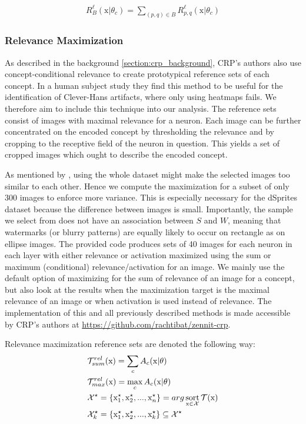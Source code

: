 \begin{align}\label{eq:local_importance}
    R_{B}^{\ell}(\mathrm{x} | \theta_c) = \sum_{(p,q) \in B} R_{p,q}^{\ell}(\mathrm{x} | \theta_c)
\end{align}

\subsubsection{Relevance Maximization}
As described in the background \cref{section:crp_background}, CRP's authors also use concept-conditional relevance to create prototypical reference sets of each concept. In a human subject study \citep{Achtibat2023} they find this method to be useful for the identification of Clever-Hans artifacts, where only using heatmaps fails. We therefore aim to include this technique into our analysis. The reference sets consist of  images with maximal relevance for a neuron. Each image can be further concentrated on the encoded concept by thresholding the relevance and by cropping to the receptive field of the neuron in question. This yields a set of cropped images which ought to describe the encoded concept. 

As mentioned by \citet{Achtibat2022}, using the whole dataset might make the selected images too similar to each other. Hence we compute the maximization for a subset of only 300 images to enforce more variance. This is especially necessary for the dSprites dataset because the difference between images is small. Importantly, the sample we select from does not have an association between $S$ and $W$, meaning that watermarks (or blurry patterns) are equally likely to occur on rectangle as on ellipse images. 
The provided code produces sets of 40 images for each neuron in each layer with either relevance or activation maximized using the sum or maximum (conditional) relevance/activation for an image. We mainly use the default option of maximizing for the sum of relevance of an image for a concept, but also look at the results when the maximization target is the maximal relevance of an image or when activation is used instead of relevance. 
The implementation of this and all previously described methods is made accessible by CRP's authors at
\url{https://github.com/rachtibat/zennit-crp}. 

Relevance maximization reference sets are denoted the following way:
 \begin{align}
& \mathcal{T}_{sum}^{rel} (\mathrm{x}) = \sum_{c} A_c(\mathrm{x}|\theta) \\
& \mathcal{T}_{max}^{rel} (\mathrm{x}) = \max_{c} A_c(\mathrm{x}|\theta) \\
&\mathcal{X}^{\star} = \{ \mathrm{x}_{1}^{\star},\mathrm{x}_{2}^{\star},..., \mathrm{x}_{n}^{\star} \} = arg \operatorname*{sort}_{\mathrm{x} \in \mathcal{X}} \mathcal{T}(\mathrm{x}) \\
& \mathcal{X}_{k}^{\star} = \{ \mathrm{x}_{1}^{\star},\mathrm{x}_{2}^{\star},..., \mathrm{x}_{k}^{\star} \} \subseteq \mathcal{X}^{\star}
 \end{align}